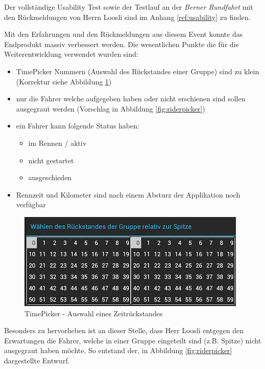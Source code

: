 Der vollständige Usability Test sowie der Testlauf an der \textit{Berner Rundfahrt} mit den Rückmeldungen von Herrn Loosli sind im Anhang \ref{ref:usability} zu finden.

Mit den Erfahrungen und den Rückmeldungen aus diesem Event konnte das Endprodukt massiv verbessert werden. Die wesentlichen Punkte die für die Weiterentwicklung verwendet wurden sind:
\begin{itemize}
\item TimePicker Nummern (Auswahl des Rückstandes einer Gruppe) sind zu klein (Korrektur siehe Abbildung \ref{fig:timepicker})
\item nur die Fahrer welche aufgegeben haben oder nicht erschienen sind sollen ausgegraut werden (Vorschlag in Abbildung \ref{fig:riderpicker})
\item ein Fahrer kann folgende Status haben:
\begin{itemize}
\item im Rennen / aktiv
\item nicht gestartet
\item ausgeschieden
\end{itemize}
\item Rennzeit und Kilometer sind nach einem Absturz der Applikation noch verfügbar
\end{itemize}

\begin{figure}[h!]
\caption{TimePicker - Auswahl eines Zeitrückstandes}
\label{fig:timepicker}
\centering
\includegraphics[scale=0.8]{05bericht/images/timepicker.png}
\end{figure} 
Besonders zu hervorheben ist an dieser Stelle, dass Herr Loosli entgegen den Erwartungen die Fahrer, welche in einer Gruppe eingeteilt sind (z.B. Spitze) nicht ausgegraut haben möchte. So entstand der, in Abbildung \ref{fig:riderpicker} dargestellte Entwurf.

